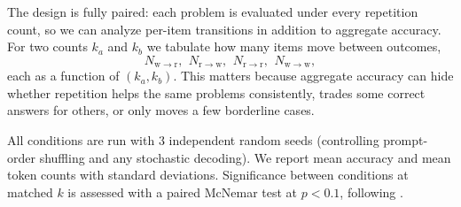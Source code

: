 The design is fully paired: each problem is evaluated under every repetition count, so
we can analyze per-item transitions in addition to aggregate accuracy. For two counts
$k_a$ and $k_b$ we tabulate how many items move between outcomes,
\[
    N_{\mathrm{w}\to\mathrm{r}},\ \,
    N_{\mathrm{r}\to\mathrm{w}},\ \,
    N_{\mathrm{r}\to\mathrm{r}},\ \,
    N_{\mathrm{w}\to\mathrm{w}},
\]
each as a function of $(k_a, k_b)$. This matters because aggregate accuracy can hide
whether repetition helps the same problems consistently, trades some correct answers
for others, or only moves a few borderline cases.

All conditions are run with $3$ independent random seeds (controlling prompt-order
shuffling and any stochastic decoding). We report mean accuracy and mean token counts
with standard deviations. Significance between conditions at matched $k$ is assessed
with a paired McNemar test \citep{mcnemar1947} at $p<0.1$, following
\citet{leviathan2025prompt}.
